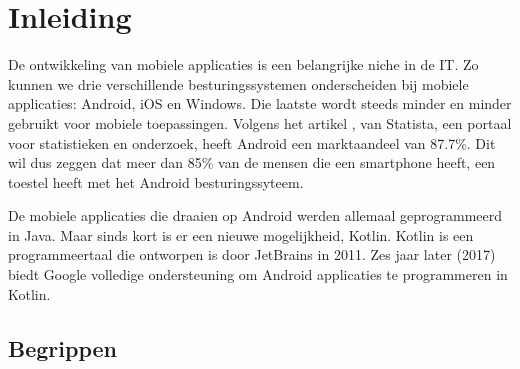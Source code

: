 \chapter{Inleiding}
\label{ch:inleiding}




 De ontwikkeling van mobiele applicaties is een belangrijke niche in de IT. Zo kunnen we drie verschillende besturingssystemen onderscheiden bij mobiele applicaties: Android, iOS en Windows. Die laatste wordt steeds minder en minder gebruikt voor mobiele toepassingen. Volgens het artikel \textcite{Statista2018}, van Statista, een portaal voor statistieken en onderzoek, heeft Android een marktaandeel van 87.7\%. Dit wil dus zeggen dat meer dan 85\% van de mensen die een smartphone heeft, een toestel heeft met het Android besturingssyteem. 

 De mobiele applicaties die draaien op Android werden allemaal geprogrammeerd in Java. Maar sinds kort is er een nieuwe mogelijkheid, Kotlin. Kotlin is een programmeertaal die ontworpen is door JetBrains in 2011. Zes jaar later (2017) biedt Google volledige ondersteuning om Android applicaties te programmeren in Kotlin. 
 
 \section{Begrippen}
